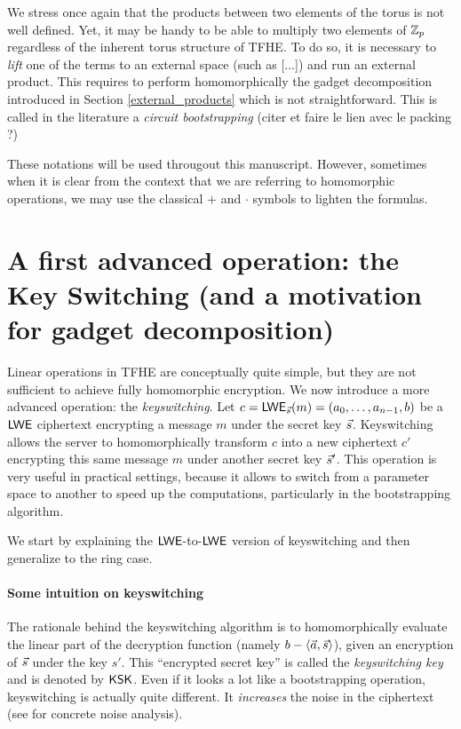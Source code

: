 We stress once again that the products between two elements of the torus is not well defined. Yet, it may be handy to be able to multiply two elements of $\mathbb{Z}_p$ regardless of the inherent torus structure of TFHE. To do so, it is necessary to \textit{lift} one of the terms to an external space (such as [...]) and run an external product. This requires to perform homomorphically the gadget decomposition introduced in Section \ref{external_products} which is not straightforward. This is called in the literature a \textit{circuit bootstrapping} (citer et faire le lien avec le packing ?)


These notations will be used througout this manuscript. However, sometimes when it is clear from the context that we are referring to homomorphic operations, we may use the classical $+$ and $\cdot$ symbols to lighten the formulas.


\section{A first advanced operation: the Key Switching (and a motivation for gadget decomposition)}
\label{sec:keyswitch}



Linear operations in TFHE are conceptually quite simple, but they are not sufficient to achieve fully homomorphic encryption. We now introduce a more advanced operation: the \textit{keyswitching}. Let $c = \textsf{LWE}_{\vec s}(m) = (a_0, \dots, a_{n-1}, b)$ be a $\textsf{LWE}$ ciphertext encrypting a message $m$ under the secret key $\vec s$. Keyswitching allows the server to homomorphically transform $c$ into a new ciphertext $c'$ encrypting this same message $m$ under another secret key $\vec s'$. This operation is very useful in practical settings, because it allows to switch from a parameter space to another to speed up the computations, particularly in the bootstrapping algorithm.

We start by explaining the $\textsf{LWE}$-to-$\textsf{LWE}$ version of keyswitching and then generalize to the ring case.



\paragraph{Some intuition on keyswitching}
The rationale behind the keyswitching algorithm is to homomorphically evaluate the linear part of the decryption function (namely $b - \langle \vec a, \vec s \rangle$), given an encryption of $\vec s$ under the key $s'$. This ``encrypted secret key'' is called the \textit{keyswitching key} and is denoted by $\textsf{KSK}$. Even if it looks a lot like a bootstrapping operation, keyswitching is actually quite different. It \textit{increases} the noise in the ciphertext (see \cite{JC:CGGI20, these_tap} for concrete noise analysis).


